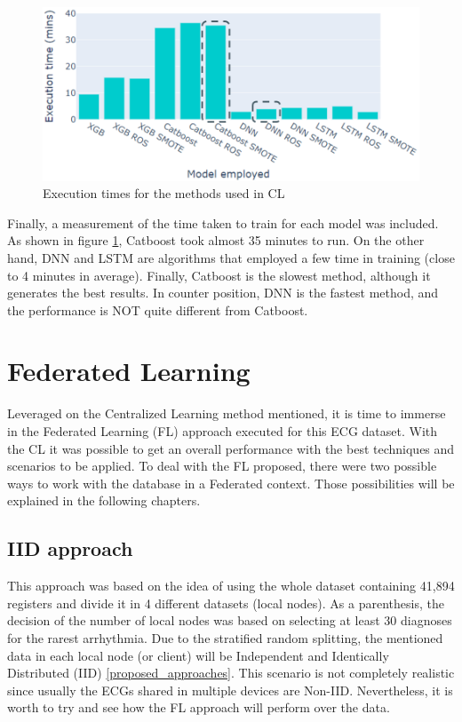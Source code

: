 \begin{figure}[H]
\centering
\includegraphics[scale=0.5]{img/times_cl.PNG}
\caption{Execution times for the methods used in CL}
\label{fig:times_cl}
\end{figure}

Finally, a measurement of the time taken to train for each model was included. As shown in figure \ref{fig:times_cl}, Catboost took almost 35 minutes to run. On the other hand, DNN and LSTM are algorithms that employed a few time in training (close to 4 minutes in average). Finally, Catboost is the slowest method, although it generates the best results. In counter position, DNN is the fastest method, and the performance is NOT quite different from Catboost.


\section{Federated Learning} \label{5FL}

Leveraged on the Centralized Learning method mentioned, it is time to immerse in the Federated Learning (FL) approach executed for this ECG dataset. With the CL it was possible to get an overall performance with the best techniques and scenarios to be applied. To deal with the FL proposed, there were two possible ways to work with the database in a Federated context. Those possibilities will be explained in the following chapters.

\subsection{IID approach}

This approach was based on the idea of using the whole dataset containing 41,894 registers and divide it in 4 different datasets (local nodes). As a parenthesis, the decision of the number of local nodes was based on selecting at least 30 diagnoses for the rarest arrhythmia. Due to the stratified random splitting, the mentioned data in each local node (or client) will be Independent and Identically Distributed (IID) \ref{proposed_approaches}. This scenario is not completely realistic since usually the ECGs shared in multiple devices are Non-IID. Nevertheless, it is worth to try and see how the FL approach will perform over the data.

